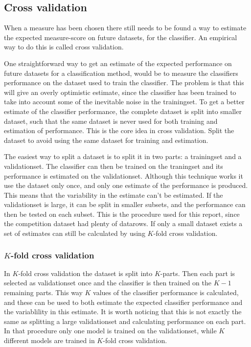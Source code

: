 \subsection{Cross validation}
When a measure has been chosen there still needs to be found a way to estimate the expected measure-score on future datasets, for the classifier. An empirical way to do this is called cross validation. \par
One straightforward way to get an estimate of the expected performance on future datasets for a classification method, would be to measure the classifiers performance on the dataset used to train the classifier. The problem is that this will give an overly optimistic estimate, since the classifier has been trained to take into account some of the inevitable noise in the trainingset. To get a better estimate of the classifier performance, the complete dataset is split into smaller dataset, such that the same dataset is never used for both training and estimation of performance. This is the core idea in cross validation. Split the dataset to avoid using the same dataset for training and estimation. \par
The easiest way to split a dataset is to split it in two parts: a trainingset and a validationset. The classifier can then be trained on the traningset and its performance is estimated on the validationset. Although this technique works it use the dataset only once, and only one estimate of the performance is produced. This means that the variability in the estimate can't be estimated. If the validationset is large, it can be split in smaller subsets, and the performance can then be tested on each subset. This is the procedure used for this report, since the competition dataset had plenty of datarows. If only a small dataset exists a set of estimates can still be calculated by using $K$-fold cross validation. 

\subsubsection{$K$-fold cross validation}
In $K$-fold cross validation the dataset is split into $K$-parts. Then each part is selected as validationset once and the classifier is then trained on the $K-1$ remaining parts. This way $K$ values of the classifier performance is calculated, and these can be used to both estimate the expected classifier performance and the variablility in this estimate. It is worth noticing that this is not exactly the same as splitting a large validationset and calculating performance on each part. In that procedure only one model is trained on the validationset, while $K$ different models are trained in $K$-fold cross validation.

